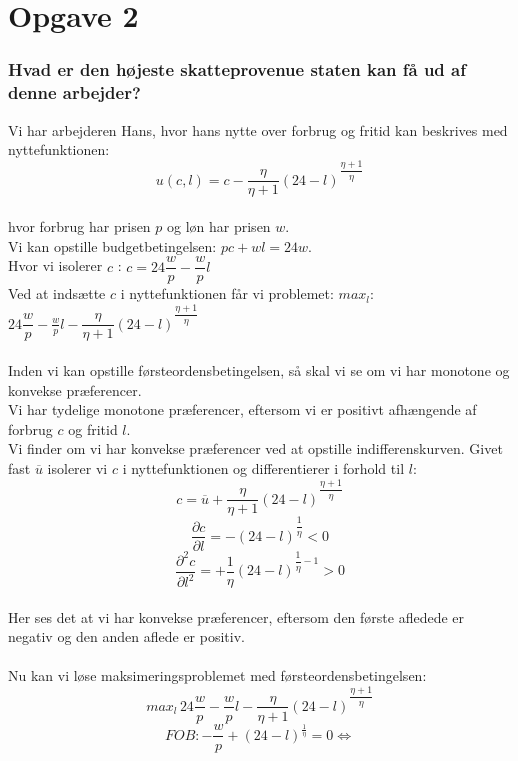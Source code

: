 \documentclass[a4paper, 12pt]{article}
\begin{document}

\section*{Opgave 2}

\subsubsection*{Hvad er den højeste skatteprovenue staten kan få ud af denne arbejder?}
Vi har arbejderen Hans, hvor hans nytte over forbrug og fritid kan beskrives med nyttefunktionen:
$$u(c,l) = c - \dfrac{\eta}{\eta + 1} (24-l)^{\dfrac{\eta + 1}{\eta}}$$
\\
hvor forbrug har prisen $p$ og løn har prisen $w$.
\\
Vi kan opstille budgetbetingelsen: $pc + wl = 24w$.
\\
Hvor vi isolerer $c$ : $c=24\dfrac{w}{p}-\dfrac{w}{p}l$
\\
Ved at indsætte $c$ i nyttefunktionen får vi problemet: $ max_{l}$: $24\dfrac{w}{p}-\frac{w}{p}l - \dfrac{\eta}{\eta + 1} (24-l)^{\dfrac{\eta + 1}{\eta}} $
\\\\
Inden vi kan opstille førsteordensbetingelsen, så skal vi se om vi har monotone og konvekse præferencer.
\\
Vi har tydelige monotone præferencer, eftersom vi er positivt afhængende af forbrug $c$ og fritid $l$.
\\
Vi finder om vi har konvekse præferencer ved at opstille indifferenskurven. Givet fast $\overline{u}$ isolerer vi $c$ i nyttefunktionen og differentierer i forhold til $l$:
$$c = \overline{u}+ \dfrac{\eta}{\eta + 1} (24-l)^{\dfrac{\eta + 1}{\eta}}$$
$$\dfrac{\partial c}{\partial l} = -(24-l)^{\dfrac{1}{\eta}} < 0$$
$$\dfrac{\partial^{2} c}{\partial l^{2}} = +\dfrac{1}{\eta}(24-l)^{\dfrac{1}{\eta}-1} > 0$$
\\
Her ses det at vi har konvekse præferencer, eftersom den første afledede er negativ og den anden aflede er positiv.
\\\\
Nu kan vi løse maksimeringsproblemet med førsteordensbetingelsen:
$$max_{l} \, 24\dfrac{w}{p}-\frac{w}{p}l - \dfrac{\eta}{\eta + 1} (24-l)^{\dfrac{\eta + 1}{\eta}}$$
$$FOB: -\dfrac{w}{p} + (24-l)^{\frac{1}{\eta}} = 0 \Leftrightarrow$$
\end{document}
